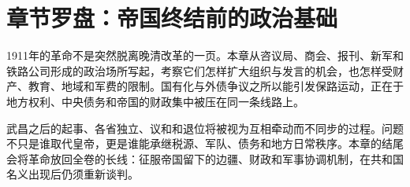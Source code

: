 \section{章节罗盘：帝国终结前的政治基础}
\label{sec:revolution-compass}

1911年的革命不是突然脱离晚清改革的一页。本章从咨议局、商会、报刊、新军和铁路公司形成的政治场所写起，考察它们怎样扩大组织与发言的机会，也怎样受财产、教育、地域和军费的限制。国有化与外债争议之所以能引发保路运动，正在于地方权利、中央债务和帝国的财政集中被压在同一条线路上。

武昌之后的起事、各省独立、议和和退位将被视为互相牵动而不同步的过程。问题不只是谁取代皇帝，更是谁能承继税源、军队、债务和地方日常秩序。本章的结尾会将革命放回全卷的长线：征服帝国留下的边疆、财政和军事协调机制，在共和国名义出现后仍须重新谈判。
